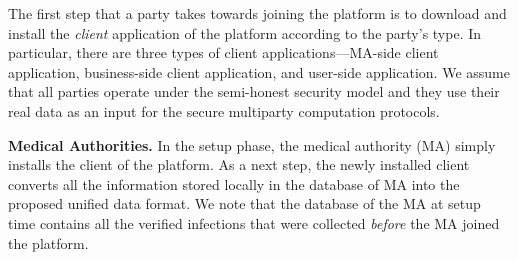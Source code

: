 

The first step that a party takes towards joining the \sysname platform is to download and install the \emph{client} application of the platform according to the party's type. In particular, there are three types of client applications---MA-side client application, business-side client application, and user-side application.
We assume that all parties operate under the semi-honest security model and they use their real data as an input for the secure multiparty computation protocols. 



\textbf{Medical Authorities. }In the setup phase, the medical authority (MA) simply installs the client of the platform. 
As a next step, the newly installed client converts all the information stored locally in the database of MA into the proposed unified data format. 
We note that the database of the MA at setup time contains all the verified infections that were collected \emph{before} the MA joined the platform.


